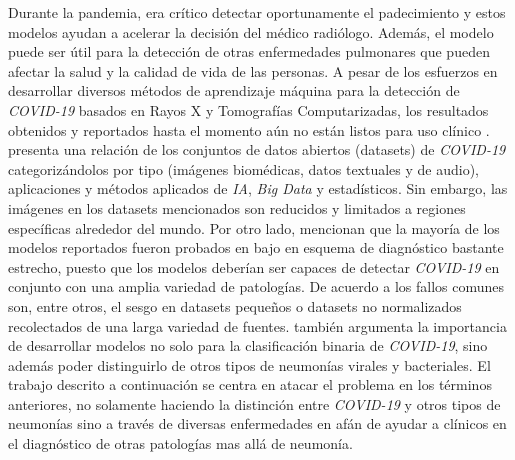 Durante la pandemia, era crítico detectar oportunamente el padecimiento y estos modelos ayudan a
acelerar la decisión del médico radiólogo. Además, el modelo puede ser útil para la detección de
otras enfermedades pulmonares que pueden afectar la salud y la calidad de vida de las personas. A
pesar de los esfuerzos en desarrollar diversos métodos de aprendizaje máquina para la detección de
\textit{COVID-19} basados en Rayos X y Tomografías Computarizadas, los resultados obtenidos y
reportados hasta el momento aún no están listos para uso clínico \cite{roberts2021common}.
\citeauthor{shuja2021covid} presenta una relación de los conjuntos de datos abiertos (datasets) de
\textit{COVID-19} categorizándolos por tipo (imágenes biomédicas,
datos textuales y de audio), aplicaciones y métodos aplicados de \textit{IA}, \textit{Big Data} y
estadísticos. Sin embargo, las imágenes en los datasets mencionados son reducidos y limitados a
regiones específicas alrededor del mundo. Por otro lado, \citeauthor{greenspan2020position} mencionan
que la mayoría de los modelos reportados fueron probados en bajo en esquema de diagnóstico bastante
estrecho, puesto que los modelos deberían ser capaces de detectar \textit{COVID-19} en conjunto
con una amplia variedad de patologías. De acuerdo a \citeauthor{roberts2021common} los fallos comunes
son, entre otros, el sesgo en datasets pequeños o datasets no normalizados recolectados de una larga
variedad de fuentes. \citeauthor{roberts2021common} también argumenta la importancia de desarrollar
modelos no solo para la clasificación binaria de \textit{COVID-19}, sino además poder distinguirlo
de otros tipos de neumonías virales y bacteriales. El trabajo descrito a continuación se centra en
atacar el problema en los términos anteriores, no solamente haciendo la distinción entre
\textit{COVID-19} y otros tipos de neumonías sino a través de diversas enfermedades en afán de ayudar
a clínicos en el diagnóstico de otras patologías mas allá de neumonía.
